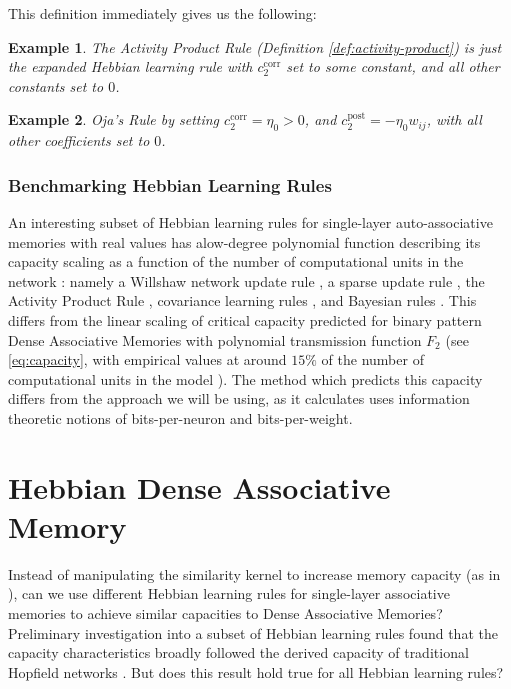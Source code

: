 \documentclass{article}
\newtheorem{example}{Example}[subsection]
\theoremstyle{definition}
\begin{document}
This definition immediately gives us the following:
\begin{example}
  The Activity Product Rule (Definition \ref{def:activity-product}) is
  just the expanded Hebbian learning rule with $c_2^\text{corr}$
  set to some constant, and all other constants set to $0$.
\end{example}

\begin{example}
  \textit{Oja's Rule} \parencite{oja_simplified_1982}
  by setting $c_2^\text{corr} = \eta_0 > 0$,
  and $c_2^\text{post} = - \eta_0 w_{ij}$, with all other
  coefficients set to $0$.
\end{example}

\subsubsection{Benchmarking Hebbian Learning Rules}

An interesting subset of Hebbian learning rules for
single-layer auto-associative memories with real values
has alow-degree polynomial function describing
its capacity scaling as a function of the number of computational
units in the network \parencite{lansner_benchmarking_2025}:
namely a Willshaw network update rule \parencite{willshaw_non-holographic_1969},
a sparse update rule \parencite{hopfield_neural_1982}, the Activity Product
Rule \parencite{haykin_neural_2009}, covariance learning rules
\parencites{tsodyks_enhanced_1988,minai_covariance_1997},
and Bayesian rules \parencites{lansner_higher_1996,knoblauch_neural_2011}.
This differs from the linear scaling of critical capacity predicted
for binary pattern Dense Associative Memories with polynomial
transmission function $F_2$ (see \autoref{eq:capacity}, with empirical
  values at around $15\%$ of the number of computational units in the model
\parencite{hopfield_neural_1982,amit_statistical_1987}).
The method which predicts this capacity differs from the approach
we will be using, as it calculates uses information theoretic
notions of bits-per-neuron and bits-per-weight.

\section{Hebbian Dense Associative Memory}\label{sec:hebbian-dam}

Instead of manipulating the similarity kernel to increase
memory capacity (as in \textcite{hoover_dense_2024,hu_provably_2024}),
can we use different Hebbian learning rules for
single-layer associative memories to
achieve similar capacities to Dense Associative Memories? Preliminary
investigation into a subset of Hebbian learning rules
found that the capacity characteristics broadly followed the
derived capacity of traditional Hopfield networks
\parencite{lansner_benchmarking_2025}. But does this result
hold true for all Hebbian learning rules?
\end{document}
